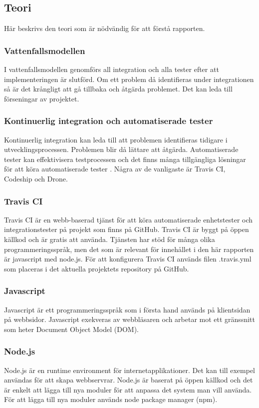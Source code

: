 \subsection{Teori}
Här beskrivs den teori som är nödvändig för att förstå rapporten.

\subsubsection{Vattenfallsmodellen}
I vattenfallsmodellen genomförs all integration och alla tester efter att implementeringen är slutförd. 
Om ett problem då identifieras under integrationen så är det krångligt att gå tillbaka och åtgärda problemet. 
Det kan leda till förseningar av projektet.

\subsubsection{Kontinuerlig integration och automatiserade tester}
Kontinuerlig integration kan leda till att problemen identifieras tidigare i 
utvecklingsprocessen. Problemen blir då lättare att åtgärda. Automatiserade tester kan effektivisera 
testprocessen och det finns många tillgängliga lösningar för att köra automatiserade
tester \cite{Karlsson}.
Några av de vanligaste är Travis CI, Codeship och Drone.

\subsubsection{Travis CI}
Travis CI är en webb-baserad tjänst för att köra automatiserade enhetstester och integrationstester
på projekt som finns på GitHub. Travis CI är byggt på öppen källkod och är gratis att använda. 
Tjänsten har stöd för många olika programmeringsspråk, men det som är relevant för innehållet i den här rapporten
är javascript med node.js. För att konfigurera Travis CI används filen .travis.yml som placeras i det aktuella
projektets repository på GitHub.

\subsubsection{Javascript}
Javascript är ett programmeringsspråk som i första hand används på klientsidan på webbsidor.
Javascript exekveras av webbläsaren och arbetar mot ett gränssnitt som heter Document Object Model (DOM).

\subsubsection{Node.js}
Node.js är en runtime environment för internetapplikationer. Det kan till exempel användas för att skapa webbservrar.
Node.js är baserat på öppen källkod och det är enkelt att lägga till nya moduler för att anpassa det system man vill
använda. För att lägga till nya moduler används node package manager (npm).

